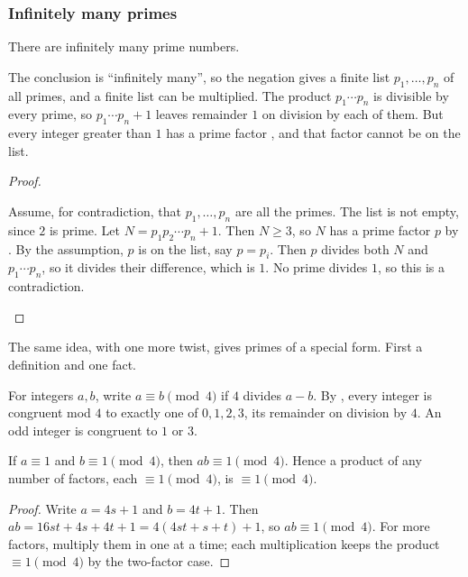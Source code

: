\documentclass[10pt]{scrartcl}
\begin{document}
\subsubsection*{Infinitely many primes}

\begin{theorem*}
  There are infinitely many prime numbers.
\end{theorem*}
\begin{ideabox}
  The conclusion is ``infinitely many'', so the negation gives a finite list $p_1, \dots, p_n$ of all primes, and a finite list can be multiplied. The product $p_1 \cdots p_n$ is divisible by every prime, so $p_1 \cdots p_n + 1$ leaves remainder $1$ on division by each of them. But every integer greater than $1$ has a prime factor , and that factor cannot be on the list.
\end{ideabox}
\begin{proof}
  \begin{steps}
    \ii Assume, for contradiction, that $p_1, \dots, p_n$ are all the primes. The list is not empty, since $2$ is prime.
    \ii Let $N = p_1 p_2 \cdots p_n + 1$. Then $N \geq 3$, so $N$ has a prime factor $p$ by .
    \ii By the assumption, $p$ is on the list, say $p = p_i$. Then $p$ divides both $N$ and $p_1 \cdots p_n$, so it divides their difference, which is $1$. No prime divides $1$, so this is a contradiction.
  \end{steps}
\end{proof}

The same idea, with one more twist, gives primes of a special form. First a definition and one fact.

\begin{definition*}
  For integers $a, b$, write $a \equiv b \pmod 4$ if $4$ divides $a - b$. By , every integer is congruent mod $4$ to exactly one of $0, 1, 2, 3$, its remainder on division by $4$. An odd integer is congruent to $1$ or $3$.
\end{definition*}

\begin{fact*}
  If $a \equiv 1$ and $b \equiv 1 \pmod 4$, then $ab \equiv 1 \pmod 4$. Hence a product of any number of factors, each $\equiv 1 \pmod 4$, is $\equiv 1 \pmod 4$.
\end{fact*}
\begin{proof}
  Write $a = 4s + 1$ and $b = 4t + 1$. Then $ab = 16st + 4s + 4t + 1 = 4(4st + s + t) + 1$, so $ab \equiv 1 \pmod 4$. For more factors, multiply them in one at a time; each multiplication keeps the product $\equiv 1 \pmod 4$ by the two-factor case.
\end{proof}
\end{document}

